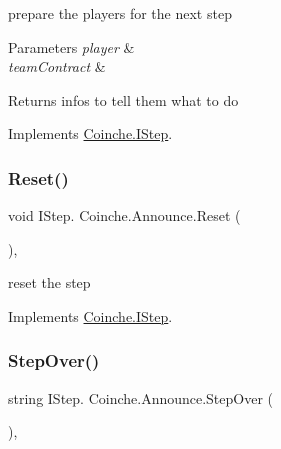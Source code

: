 prepare the players for the next step 


\begin{DoxyParams}{Parameters}
{\em player} & \\
\hline
{\em team\+Contract} & \\
\hline
\end{DoxyParams}
\begin{DoxyReturn}{Returns}
infos to tell them what to do
\end{DoxyReturn}


Implements \hyperlink{interface_coinche_1_1_i_step_ada17a0e471c5afbc7e4f4acc434cdd76}{Coinche.\+I\+Step}.

\mbox{\label{class_coinche_1_1_announce_a0fddda733e5f081be1091b2c67279982}} 
\subsubsection{\texorpdfstring{Reset()}{Reset()}}
{\footnotesize\ttfamily void I\+Step. Coinche.\+Announce.\+Reset (\begin{DoxyParamCaption}{ }\end{DoxyParamCaption})\hspace{0.3cm}{\ttfamily [inline]}, {\ttfamily [private]}}



reset the step 



Implements \hyperlink{interface_coinche_1_1_i_step_a764f20494a35e9b006c6495a38717e9a}{Coinche.\+I\+Step}.

\mbox{\label{class_coinche_1_1_announce_a3337d94429e31a70eb66ee0be3714e86}} 
\subsubsection{\texorpdfstring{Step\+Over()}{StepOver()}}
{\footnotesize\ttfamily string I\+Step. Coinche.\+Announce.\+Step\+Over (\begin{DoxyParamCaption}{ }\end{DoxyParamCaption})\hspace{0.3cm}{\ttfamily [inline]}, {\ttfamily [private]}}



